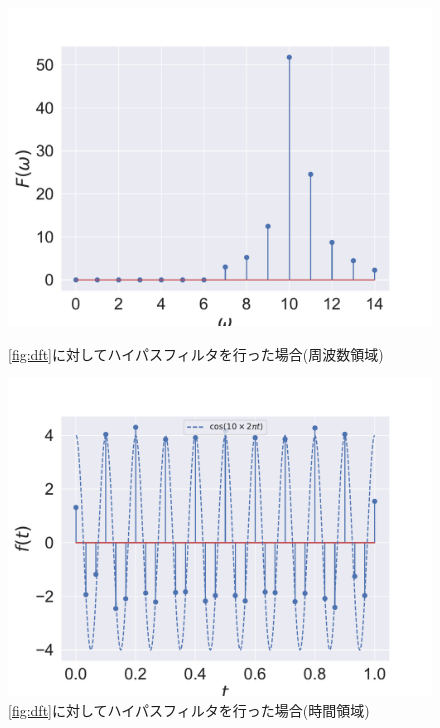 \iffigure
\begin{figure}[h]
  \begin{minipage}{.45\hsize}
    \centering
    \includegraphics[clip, width=\textwidth]{figure/high_pass_dft.pdf}
    \caption{\autoref{fig:dft}に対してハイパスフィルタを行った場合(周波数領域)}
    \label{fig:high_sin}
  \end{minipage}
  \begin{minipage}{.45\hsize}
    \centering
    \includegraphics[clip, width=\textwidth]{figure/high_pass_idft.pdf}
    \caption{\autoref{fig:dft}に対してハイパスフィルタを行った場合(時間領域)}
    \label{fig:high_sin}
  \end{minipage}
\end{figure}
\fi

